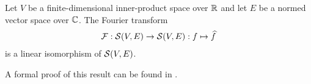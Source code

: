 \begin{boxtheorem}
    Let $V$ be a finite-dimensional inner-product space over $\mathbb{R}$ and let $E$ be a normed vector space over $\mathbb{C}$. The Fourier transform
    \begin{align*}
        \mathcal{F} : \mathcal{S}(V, E) \to \mathcal{S}(V, E) : f \mapsto \widehat{f}
    \end{align*}
    is a linear isomorphism of $\mathcal{S}(V, E)$. %
\end{boxtheorem}

A formal proof of this result can be found in \mathlib.

